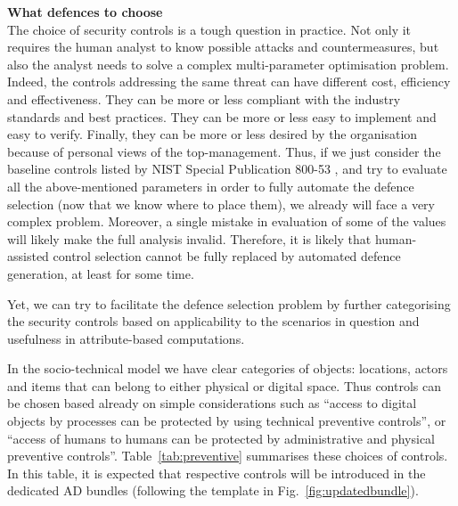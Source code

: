 \documentclass{llncs}
\begin{document}
\textbf{What defences to choose}\\
The choice of security controls is a tough question in practice. Not only it requires the human analyst to know possible attacks and countermeasures, but also the analyst needs to solve a complex multi-parameter optimisation problem. Indeed, the controls addressing the same threat can have different cost, efficiency and effectiveness. They can be more or less compliant with the industry standards and best practices. They can be more or less easy to implement and easy to verify. Finally, they can be more or less desired by the organisation because of personal views of the top-management. Thus, if we just consider the baseline controls listed by NIST Special Publication 800-53 \cite{NIST-800-53}, and try to evaluate all the above-mentioned parameters in order to fully automate the defence selection (now that we know where to place them), we already will face a very complex problem. Moreover, a single mistake in evaluation of some of the values will likely make the full analysis invalid. Therefore, it is likely that human-assisted control selection cannot be fully replaced by automated defence generation, at least for some time.

Yet, we can try to facilitate the defence selection problem by further categorising the security controls based on applicability to the scenarios in question and usefulness in attribute-based computations. 

In the socio-technical model we have clear categories of objects: locations, actors and items that can belong to either physical or digital space. Thus controls can be chosen based already on simple considerations such as ``access to digital objects by processes can be protected by using technical preventive controls'', or ``access of humans to humans can be protected by administrative and physical preventive controls''. Table~\ref{tab:preventive} summarises these choices of controls. In this table, it is expected that respective controls will be introduced in the dedicated AD bundles (following the template in Fig.~\ref{fig:updatedbundle}).
\end{document}
